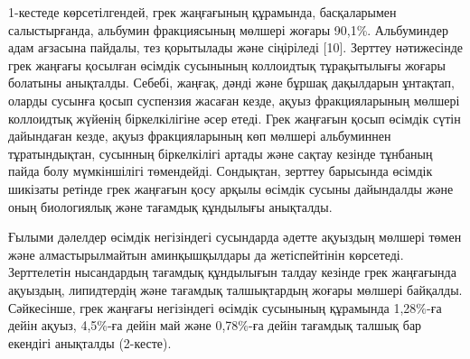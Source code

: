 \begin{multicols}{2}
1-кестеде көрсетілгендей, грек жаңғағының құрамында, басқаларымен
салыстырғанда, альбумин фракциясының мөлшері жоғары 90,1\%. Альбуминдер
адам ағзасына пайдалы, тез қорытылады және сіңіріледі {[}10{]}. Зерттеу
нәтижесінде грек жаңғағы қосылған өсімдік сусынының коллоидтық
тұрақытылығы жоғары болатыны анықталды. Себебі, жаңғақ, дәнді және
бұршақ дақылдарын ұнтақтап, оларды сусынға қосып суспензия жасаған
кезде, ақуыз фракцияларының мөлшері коллоидтық жүйенің біркелкілігіне
әсер етеді. Грек жаңғағын қосып өсімдік сүтін дайындаған кезде, ақуыз
фракцияларының көп мөлшері альбуминнен тұратындықтан, сусынның
біркелкілігі артады және сақтау кезінде тұнбаның пайда болу мүмкіншілігі
төмендейді. Сондықтан, зерттеу барысында өсімдік шикізаты ретінде грек
жаңғағын қосу арқылы өсімдік сусыны дайындалды және оның биологиялық
және тағамдық құндылығы анықталды.

Ғылыми дәлелдер өсімдік негізіндегі сусындарда әдетте ақуыздың мөлшері
төмен және алмастырылмайтын аминқышқылдары да жетіспейтінін көрсетеді.
Зерттелетін нысандардың тағамдық құндылығын талдау кезінде грек
жаңғағында ақуыздың, липидтердің және тағамдық талшықтардың жоғары
мөлшері байқалды. Сәйкесінше, грек жаңғағы негізіндегі өсімдік сусынының
құрамында 1,28\%-ға дейін ақуыз, 4,5\%-ға дейін май және 0,78\%-ға дейін
тағамдық талшық бар екендігі анықталды (2-кесте).
\end{multicols}

\begin{table}[H]
\caption*{2-кесте - Грек жаңғағы негізіндегі өсімдік сүтінің тағамдық құндылығы}
\centering
{}
\end{table}

